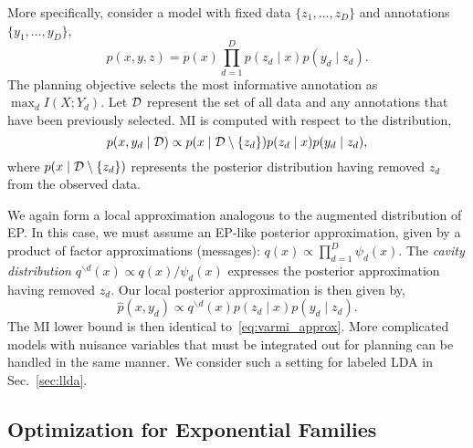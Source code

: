 More specifically, consider a model with fixed data $\{z_1,\ldots,z_D\}$
and annotations $\{y_1,\ldots,y_D\}$,
\[
  p(x,y,z) = p(x) \prod_{d=1}^D p(z_d \mid x) p(y_d \mid z_d). 
\]
The planning objective selects the most informative annotation as
$\max_d I(X;Y_d)$.  Let $\mathcal{D}$ represent the set of all data and any
annotations that have been previously selected.  MI is computed with
respect to the distribution,
\[
  p(x,y_d \mid \mathcal{D}) \propto p(x \mid \mathcal{D} \setminus \{z_d\}) p(z_d \mid
    x ) p(y_d \mid z_d),
\]
where $p(x \mid \mathcal{D} \setminus \{z_d\})$ represents the posterior
distribution having removed $z_d$ from the observed data.

We again form a local approximation analogous to the augmented
distribution of EP.  In this case, we must assume an EP-like posterior
approximation, given by a product of factor approximations (messages):
$q(x) \propto \prod_{d=1}^D \psi_d(x)$.  The \emph{cavity
  distribution} $q^{\backslash d}(x) \propto q(x) / \psi_d(x)$
expresses the posterior approximation having removed $z_d$.  Our local
posterior approximation is then given by,
\[
  \hat{p}(x, y_d) \propto q^{\backslash d}(x) p(z_d \mid x) p(y_d \mid z_d).
\]
The MI lower bound is then identical to~\eqref{eq:varmi_approx}.  More
complicated models with nuisance variables that must be integrated out
for planning can be handled in the same manner.  We consider such a
setting for labeled LDA in Sec.~\ref{sec:llda}.

\subsection{Optimization for Exponential Families}\label{sec:optim}

